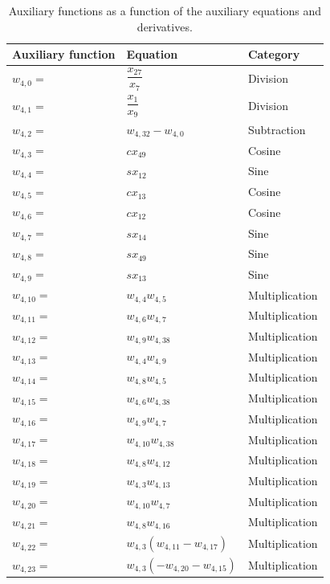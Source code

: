 \begin{longtable}{|p{1.5cm}|l|p{2cm}|}
\caption{Auxiliary functions as a function of the auxiliary equations and derivatives.}
\label{tab:auxFunc}
\endfirsthead
\endhead
\hline
\textbf{Auxiliary function} & \textbf{Equation} & \textbf{Category}  \\ \hline \hline
\hline 
$w_{4,0}=$  & $ \dfrac{x_{27}}{x_{7}} $ & Division \\ \hline
$w_{4,1}=$  & $ \dfrac{x_{1}}{x_{9}} $ & Division \\ \hline
$w_{4,2}=$  & $ w_{4,32}-w_{4,0} $ & Subtraction \\ \hline
$w_{4,3}=$  & $ cx_{49} $ & Cosine  \\ \hline
$w_{4,4}=$  & $ sx_{12} $ & Sine \\ \hline
$w_{4,5}=$  & $ cx_{13} $ & Cosine  \\ \hline
$w_{4,6}=$  & $ cx_{12} $ & Cosine \\ \hline
$w_{4,7}=$  & $ sx_{14} $ & Sine \\ \hline
$w_{4,8}=$  & $ sx_{49} $ & Sine \\ \hline
$w_{4,9}=$ & $ sx_{13} $ & Sine \\ \hline
$w_{4,10}=$ & $ w_{4,4}w_{4,5} $ & Multiplication  \\ \hline
$w_{4,11}=$ & $ w_{4,6}w_{4,7} $ &  Multiplication \\ \hline
$w_{4,12}=$ & $ w_{4,9}w_{4,38} $ & Multiplication  \\ \hline
$w_{4,13}=$ & $ w_{4,4}w_{4,9} $ &  Multiplication \\ \hline
$w_{4,14}=$ & $ w_{4,8}w_{4,5} $ & Multiplication \\ \hline
$w_{4,15}=$ & $ w_{4,6}w_{4,38} $ &  Multiplication \\ \hline
$w_{4,16}=$ & $ w_{4,9}w_{4,7} $ & Multiplication  \\ \hline
$w_{4,17}=$ & $ w_{4,10}w_{4,38} $ & Multiplication \\ \hline
$w_{4,18}=$ & $ w_{4,8}w_{4,12} $ & Multiplication  \\ \hline
$w_{4,19}=$ & $ w_{4,3}w_{4,13} $ &  Multiplication \\ \hline
$w_{4,20}=$ & $ w_{4,10}w_{4,7} $ &  Multiplication \\ \hline
$w_{4,21}=$ & $ w_{4,8}w_{4,16} $ &  Multiplication \\ \hline
$w_{4,22}=$ & $ w_{4,3}\left(w_{4,11}-w_{4,17}\right) $ & Multiplication  \\ \hline
$w_{4,23}=$ & $ w_{4,3}\left(-w_{4,20}-w_{4,15}\right) $ &  Multiplication \\ \hline

\end{longtable}

